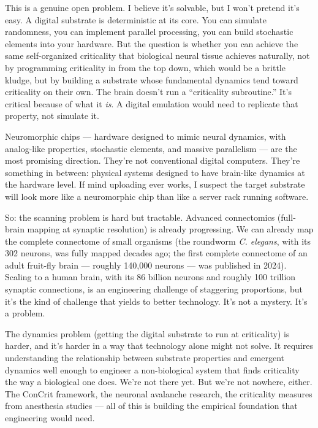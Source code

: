 \documentclass[11pt, twoside, openright]{book}
\begin{document}
This is a genuine open problem. I believe it's solvable, but I won't pretend it's easy. A digital substrate is deterministic at its core. You can simulate randomness, you can implement parallel processing, you can build stochastic elements into your hardware. But the question is whether you can achieve the same self-organized criticality that biological neural tissue achieves naturally, not by programming criticality in from the top down, which would be a brittle kludge, but by building a substrate whose fundamental dynamics tend toward criticality on their own. The brain doesn't run a ``criticality subroutine.'' It's critical because of what it \textit{is}. A digital emulation would need to replicate that property, not simulate it.

Neuromorphic chips --- hardware designed to mimic neural dynamics, with analog-like properties, stochastic elements, and massive parallelism --- are the most promising direction. They're not conventional digital computers. They're something in between: physical systems designed to have brain-like dynamics at the hardware level. If mind uploading ever works, I suspect the target substrate will look more like a neuromorphic chip than like a server rack running software.

So: the scanning problem is hard but tractable. Advanced connectomics (full-brain mapping at synaptic resolution) is already progressing. We can already map the complete connectome of small organisms (the roundworm \textit{C. elegans}, with its 302 neurons, was fully mapped decades ago; the first complete connectome of an adult fruit-fly brain --- roughly 140,000 neurons --- was published in 2024). Scaling to a human brain, with its 86 billion neurons and roughly 100 trillion synaptic connections, is an engineering challenge of staggering proportions, but it's the kind of challenge that yields to better technology. It's not a mystery. It's a problem.

The dynamics problem (getting the digital substrate to run at criticality) is harder, and it's harder in a way that technology alone might not solve. It requires understanding the relationship between substrate properties and emergent dynamics well enough to engineer a non-biological system that finds criticality the way a biological one does. We're not there yet. But we're not nowhere, either. The ConCrit framework, the neuronal avalanche research, the criticality measures from anesthesia studies --- all of this is building the empirical foundation that engineering would need.
\end{document}
